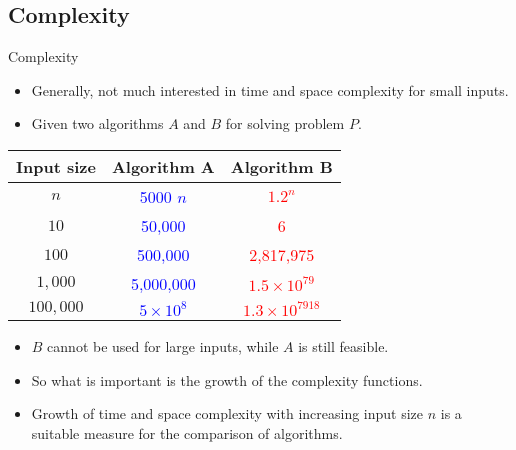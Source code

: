 \documentclass[english,10pt,table]{beamer}
\begin{document}
\subsection{Complexity}
\begin{frame}{Complexity}
		
	\begin{block}{}
	 	 \begin{itemize}\small
		 \item Generally, not much interested in time and space complexity for small inputs.
		 \item Given two algorithms \alert{$A$} and \alert{$B$} for solving problem $P$.
		\end{itemize}
  \end{block}	
	
	\begin{center}
	\small\begin{tabular}{|c|c|c|}
			\hline
			Input size & Algorithm A & Algorithm B \\ \hline
		$n$ & \textcolor{blue}{5000 $n$} & \textcolor{red}{$1.2^n$}\\ \hline
		$10$ & \textcolor{blue}{50,000} & \textcolor{red}{6}\\ \hline
		$100$ & \textcolor{blue}{500,000} & \textcolor{red}{2,817,975}\\ \hline
		$1,000$ & \textcolor{blue}{5,000,000} & \textcolor{red}{$1.5 \times 10^{79}$}\\ \hline
		$100,000$ & \textcolor{blue}{$5 \times 10^8$} & \textcolor{red}{$1.3 \times 10^{7918}$}\\ \hline
	\end{tabular}
 \end{center}
	
	\begin{block}{}
	 	 \begin{itemize}\small
		 \item <2-> \alert{$B$} cannot be used for large inputs, while \alert{$A$} is still feasible.
		 \item <2-> So what is important is the \alert{growth} of the complexity functions.
		 \item <2-> Growth of time and space complexity with increasing input size \alert{$n$} is a suitable measure for the comparison of algorithms. 
		\end{itemize}
  \end{block}		
\end{frame}

\end{document}
